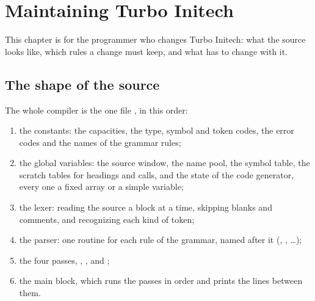 \chapter{Maintaining Turbo Initech}

This chapter is for the programmer who changes Turbo Initech: what the
source looks like, which rules a change must keep, and what has to change
with it.

\section{The shape of the source}
The whole compiler is the one file , in this order:

\begin{enumerate}
\item the constants: the capacities, the type, symbol and token codes, the
  error codes and the names of the grammar rules;
\item the global variables: the source window, the name pool, the symbol
  table, the scratch tables for headings and calls, and the state of the
  code generator, every one a fixed array or a simple variable;
\item the lexer: reading the source a block at a time, skipping blanks and
  comments, and recognizing each kind of token;
\item the parser: one routine for each rule of the grammar, named after it
  (, , \dots);
\item the four passes, , ,  and
  ;
\item the main block, which runs the passes in order and prints the lines
  between them.
\end{enumerate}

